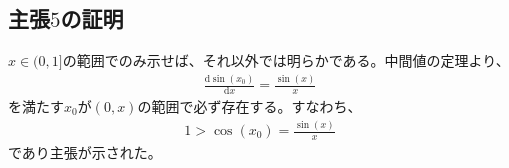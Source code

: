 \documentclass{article}
\begin{document}
\subsection{主張$5$の証明}
$x \in (0,1]$の範囲でのみ示せば、それ以外では明らかである。中間値の定理より、
\begin{align*}
	\frac{\mathrm{d} \sin(x_0)}{\mathrm{d}x} = \frac{\sin(x)}{x}
\end{align*}
を満たす$x_0$が$(0,x)$の範囲で必ず存在する。すなわち、
\begin{align*}
	1 > \cos(x_0) = \frac{\sin(x)}{x}
\end{align*}
であり主張が示された。
\end{document}
